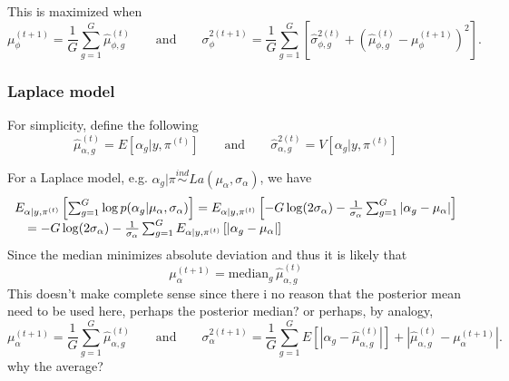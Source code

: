 \documentclass{article}
\begin{document}
This is maximized when 
\[ \mu_\phi^{(t+1)} = \frac{1}{G} \sum_{g=1}^G \hat{\mu}_{\phi,g}^{(t)} \qquad \mbox{and} \qquad 
\sigma_\phi^{2(t+1)} = \frac{1}{G} \sum_{g=1}^G \left[ \hat{\sigma}_{\phi,g}^{2(t)} + \left(\hat{\mu}_{\phi,g}^{(t)}-\mu^{(t+1)}_\phi\right)^2 \right].
\] 



\subsubsection{Laplace model}

For simplicity, define the following 
\[
\hat{\mu}_{\alpha,g}^{(t)} = E[\alpha_g|y,\pi^{(t)}] \qquad \mbox{and} \qquad
\hat{\sigma}_{\alpha,g}^{2(t)} = V[\alpha_g|y,\pi^{(t)}] 
\]

For a Laplace model, e.g. $\alpha_g|\pi \stackrel{ind}{\sim} La(\mu_\alpha,\sigma_\alpha)$, we have 
\[ 
\begin{array}{rl}
\multicolumn{2}{l}{
E_{\alpha|y,\pi^{(t)}} \left[ \sum_{g=1}^G \log p(\alpha_g|\mu_\alpha, \sigma_\alpha) \right] = 
E_{\alpha|y,\pi^{(t)}} \left[ -G\log(2\sigma_\alpha) - \frac{1}{\sigma_\alpha} \sum_{g=1}^G |\alpha_g-\mu_\alpha| \right]} \\
&= -G\log(2\sigma_\alpha) - \frac{1}{\sigma_\alpha} \sum_{g=1}^G E_{\alpha|y,\pi^{(t)}} \left[|\alpha_g-\mu_\alpha| \right] \\
\end{array}
\]
Since the median minimizes absolute deviation and thus it is likely that 
\[ 
\mu_\alpha^{(t+1)} = \mbox{median}_g\, \hat{\mu}_{\alpha,g}^{(t)}
\]
This doesn't make complete sense since there i no reason that the posterior mean need to be used here, perhaps the posterior median? 
or perhaps, by analogy,
\[
\mu_\alpha^{(t+1)} = \frac{1}{G} \sum_{g=1}^G \hat{\mu}_{\alpha,g}^{(t)} \qquad \mbox{and} \qquad
\sigma_\alpha^{2(t+1)} = \frac{1}{G} \sum_{g=1}^G E\left[\left|\alpha_g-\hat{\mu}_{\alpha,g}^{(t)}\right|\right] + \left|\hat{\mu}_{\alpha,g}^{(t)}-\mu^{(t+1)}_\alpha\right| .
\] 
why the average?
\end{document}
